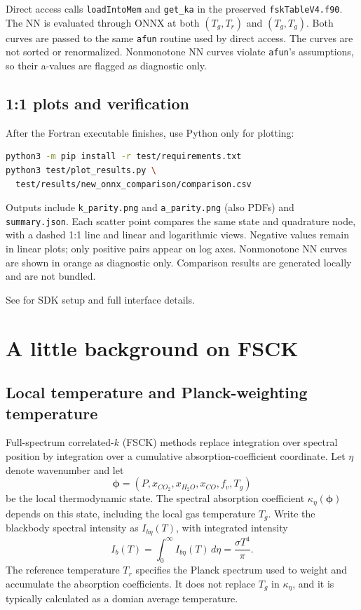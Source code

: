 \documentclass[11pt,letterpaper]{article}
\begin{document}
Direct access calls \texttt{loadIntoMem} and \texttt{get\_ka} in the preserved
\texttt{fskTableV4.f90}. The NN is evaluated through ONNX at both
$(T_g,T_r)$ and $(T_g,T_g)$. Both curves are passed to the same \texttt{afun}
routine used by direct access. The curves are not sorted or renormalized.
Nonmonotone NN curves violate \texttt{afun}'s assumptions, so their a-values
are flagged as diagnostic only.

\subsection{1:1 plots and verification}
After the Fortran executable finishes, use Python only for plotting:
\begin{lstlisting}[language=bash]
python3 -m pip install -r test/requirements.txt
python3 test/plot_results.py \
  test/results/new_onnx_comparison/comparison.csv
\end{lstlisting}
Outputs include \texttt{k\_parity.png} and \texttt{a\_parity.png} (also PDFs)
and \texttt{summary.json}. Each scatter point compares the same state and
quadrature node, with a dashed 1:1 line and linear and logarithmic views.
Negative values remain in linear plots; only positive pairs appear on log
axes. Nonmonotone NN curves are shown in orange as diagnostic only. Comparison
results are generated locally and are not bundled.

See  for SDK setup and full interface details.

\section{A little background on FSCK}
\subsection{Local temperature and Planck-weighting temperature}
Full-spectrum correlated-$k$ (FSCK) methods replace integration over spectral
position by integration over a cumulative absorption-coefficient coordinate.
Let $\eta$ denote wavenumber and let
\[
\boldsymbol{\phi}=(P,x_{CO_2},x_{H_2O},x_{CO},f_v,T_g)
\]
be the local thermodynamic state. The spectral absorption coefficient
$\kappa_\eta(\boldsymbol{\phi})$ depends on this state, including the local gas
temperature $T_g$. Write the blackbody spectral intensity as $I_{b\eta}(T)$,
with integrated intensity
\[
I_b(T)=\int_0^\infty I_{b\eta}(T)\,d\eta=\frac{\sigma T^4}{\pi}.
\]
The reference temperature $T_r$ specifies the Planck spectrum used to weight
and accumulate the absorption coefficients. It does not replace $T_g$ in
$\kappa_\eta$, and it is typically calculated as a domian average temperature. 
\end{document}

